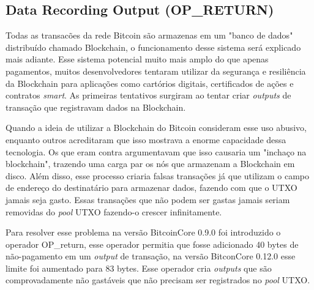 \documentclass[conference,compsoc]{IEEEtran}
\begin{document}
\subsection*{Data Recording Output (OP\_RETURN)}

Todas as transacões da rede Bitcoin são armazenas em um "banco de dados" distribuído chamado Blockchain, o funcionamento desse sistema será explicado mais adiante. Esse sistema potencial muito mais amplo do que apenas pagamentos, muitos desenvolvedores tentaram utilizar da segurança e resiliência da Blockchain para aplicações como cartórios digitais, certificados de ações e contratos \textit{smart}. As primeiras tentativos surgiram ao tentar criar \textit{outputs} de transação que registravam dados na Blockchain.

Quando a ideia de utilizar a Blockchain do Bitcoin  consideram esse uso abusivo, enquanto outros acreditaram que isso mostrava a enorme capacidade dessa tecnologia. Os que eram contra argumentavam que isso causaria um "inchaço na blockchain", trazendo uma carga par os nós que armazenam a Blockchain em disco. Além disso, esse processo criaria  falsas transações já que utilizam o campo de endereço do destinatário para armazenar dados, fazendo com que o UTXO jamais seja gasto. Essas transações que não podem ser gastas jamais seriam removidas do \textit{pool} UTXO fazendo-o crescer infinitamente. 

Para resolver esse problema na versão BitcoinCore 0.9.0 foi introduzido o operador OP\_return, esse operador permitia que fosse adicionado 40 bytes de não-pagamento em um \textit{output} de transação, na versão BitconCore 0.12.0 esse limite foi aumentado para 83 bytes. Esse operador cria \textit{outputs} que são comprovadamente não gastáveis que não precisam ser registrados no \textit{pool} UTXO.



\end{document}
